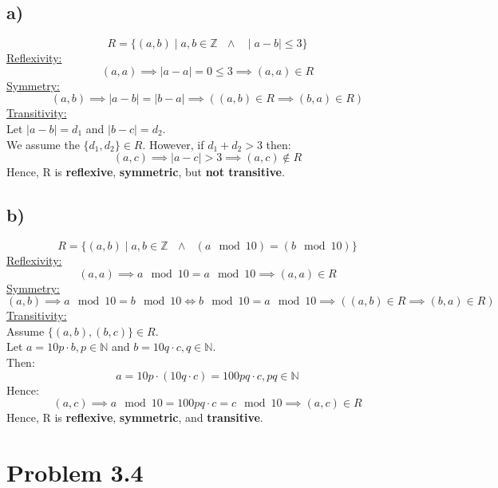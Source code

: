 \documentclass{article}
\begin{document}
\subsection*{a)}
\[
    R = \{ (a, b) \mid a, b \in \mathbb{Z} \text{ } \land \text{ } \mid a - b \mid \leq 3 \}
\]
\underline{Reflexivity:} \\
\[
    (a, a) \implies \mid a - a \mid = 0 \leq 3 \implies (a, a) \in R
\]
\underline{Symmetry:} \\
\[
    (a, b) \implies \mid a - b \mid = \mid b - a \mid \implies ((a, b) \in R \implies (b, a) \in R)
\]
\underline{Transitivity:} \\
Let $\mid a - b \mid = d_1$ and $\mid b - c \mid = d_2$. \\
We assume the $\{ d_1, d_2 \} \in R$.
However, if $d_1 + d_2 > 3$ then:
\[
    (a, c) \implies \mid a - c \mid > 3 \implies (a, c) \notin R
\]
Hence, R is \textbf{reflexive}, \textbf{symmetric}, but \textbf{not transitive}. \\

\subsection*{b)}
\[
    R = \{ (a,b) \mid a, b \in \mathbb{Z} \text{ } \land \text{ } (a \mod{10}) = (b \mod{10}) \}
\]
\underline{Reflexivity:} \\
\[
    (a, a) \implies a \mod{10} = a \mod{10} \implies (a, a) \in R
\]
\underline{Symmetry:} \\
\[
    (a, b) \implies a \mod{10} = b \mod{10} \iff b \mod{10} = a \mod{10} \implies ((a, b) \in R \implies (b, a) \in R)
\]
\underline{Transitivity:} \\
Assume $\{ (a, b), (b, c) \} \in R$. \\
Let $a = 10p \cdot b, p \in \mathbb{N}$ and $b = 10q \cdot c, q \in \mathbb{N}$. \\
Then: \\
\[
    a = 10p \cdot (10q \cdot c) = 100pq \cdot c, pq \in \mathbb{N}
\]
Hence: \\
\[
    (a, c) \implies a \mod{10} = 100pq \cdot c = c \mod{10} \implies (a, c) \in R
\]
Hence, R is \textbf{reflexive}, \textbf{symmetric}, and \textbf{transitive}. \\

\section*{Problem 3.4}
\end{document}
